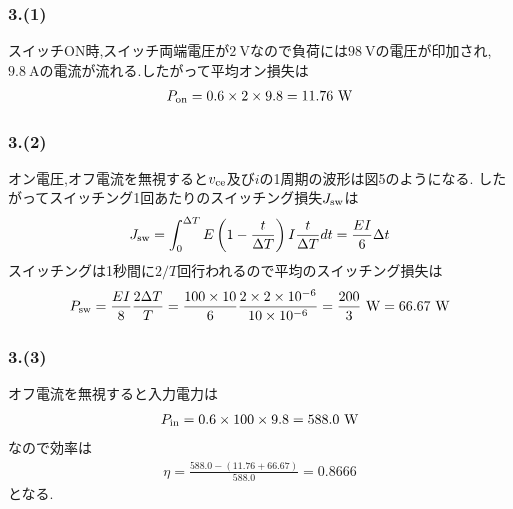 \subsubsection*{3.(1)}
スイッチON時,スイッチ両端電圧が$2\ \si{\volt}$なので負荷には$98\ \si{\volt}$の電圧が印加され,
$9.8\ \si{\ampere}$の電流が流れる.したがって平均オン損失は
\begin{align*}
  P_{\rm on}=0.6\times2\times9.8=11.76\ \si{\watt}
\end{align*}
\subsubsection*{3.(2)}
オン電圧,オフ電流を無視すると$v_{\rm ce}$及び$i$の1周期の波形は図5のようになる.
したがってスイッチング1回あたりのスイッチング損失$J_{\rm sw}$は
\begin{align*}
  J_{\rm sw}=\int_0^{\Delta T}E\left(1-\frac{t}{\Delta T}\right)I\frac{t}{\Delta T}dt=\frac{EI}{6}\Delta t
\end{align*}
スイッチングは1秒間に$2/T$回行われるので平均のスイッチング損失は
\begin{align*}
  P_{\rm sw}=\frac{EI}{8}\frac{2\Delta T}{T}=\frac{100\times10}{6}\frac{2\times 2\times10^{-6}}{10\times10^{-6}}=\frac{200}{3}\ \si{\watt}=66.67\ \si{\watt}
\end{align*}
\subsubsection*{3.(3)}
オフ電流を無視すると入力電力は
\begin{align*}
  P_{\rm in}=0.6\times100\times9.8=588.0\ \si{\watt}
\end{align*}
なので効率は
\begin{align*}
  \eta=\frac{588.0-(11.76+66.67)}{588.0}=0.8666
\end{align*}
となる.
